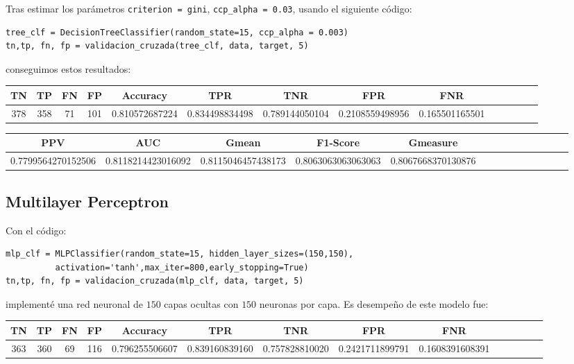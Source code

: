 \documentclass[a4]{article}
\begin{document}
Tras estimar los parámetros \texttt{criterion = gini}, \texttt{ccp\_alpha = 0.03}, usando el siguiente código:

\begin{lstlisting}
tree_clf = DecisionTreeClassifier(random_state=15, ccp_alpha = 0.003)
tn,tp, fn, fp = validacion_cruzada(tree_clf, data, target, 5)
\end{lstlisting}

conseguimos estos resultados:

\begin{center}
\begin{tabular}{|c|c|c|c|c|c|c|c|c|c|c|c|c|c|}
\hline
\multicolumn{1}{|c|}{\textbf{TN}}& \textbf{TP} & \textbf{FN} & \textbf{FP} & \textbf{Accuracy} & \textbf{TPR} & \textbf{TNR} & \textbf{FPR} &\textbf{FNR} \\ \hline
  378 & 358 & 71 & 101 & 0.810572687224 & 0.834498834498 & 0.789144050104 & 0.2108559498956 & 0.165501165501 \\ \hline
\end{tabular}
\end{center}

\begin{center}
\begin{tabular}{|c|c|c|c|c|c|c|c|c|c|c|c|c|c|}
\hline
\multicolumn{1}{|c|}{\textbf{PPV}} & \textbf{AUC} & \textbf{Gmean} & \textbf{F1-Score} & \textbf{Gmeasure}  \\ \hline
  0.7799564270152506 & 0.8118214423016092 & 0.8115046457438173 & 0.8063063063063063 & 0.8067668370130876 \\ \hline
\end{tabular}
\end{center}


\subsection{Multilayer Perceptron}

Con el código:

\begin{lstlisting}
mlp_clf = MLPClassifier(random_state=15, hidden_layer_sizes=(150,150),
          activation='tanh',max_iter=800,early_stopping=True)
tn,tp, fn, fp = validacion_cruzada(mlp_clf, data, target, 5)
\end{lstlisting}

implementé una red neuronal de $150$ capas ocultas con $150$ neuronas por capa. Es desempeño de este modelo fue:

\begin{center}
\begin{tabular}{|c|c|c|c|c|c|c|c|c|c|c|c|c|c|}
\hline
\multicolumn{1}{|c|}{\textbf{TN}}& \textbf{TP} & \textbf{FN} & \textbf{FP} & \textbf{Accuracy} & \textbf{TPR} & \textbf{TNR} & \textbf{FPR} &\textbf{FNR} \\ \hline
  363 & 360 & 69 & 116 & 0.796255506607 & 0.839160839160 & 0.757828810020 & 0.2421711899791 & 0.1608391608391 \\ \hline
\end{tabular}
\end{center}
\end{document}
